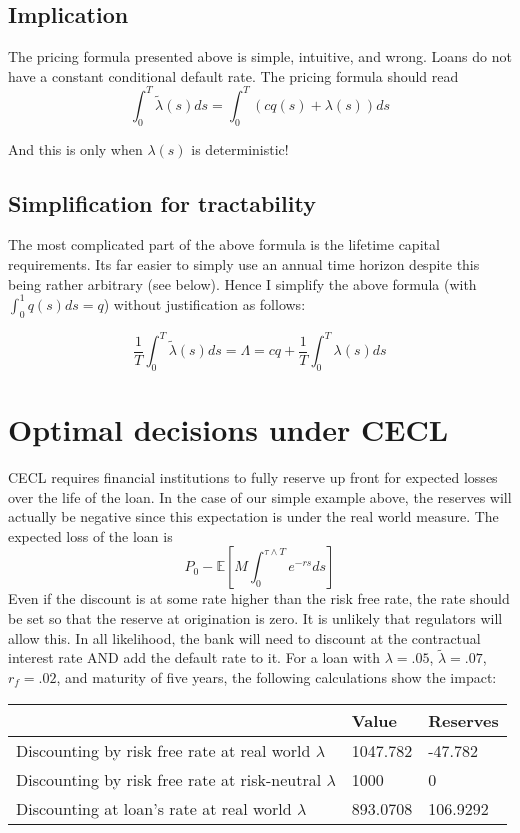 \documentclass{article}
\begin{document}
\subsection{Implication}

The pricing formula presented above is simple, intuitive, and wrong.  Loans do not have a constant conditional default rate.  The pricing formula should read \[\int_0^T\tilde{\lambda}(s) ds = \int_0^T \left(c q(s) +\lambda(s)\right)ds\]

And this is only when \(\lambda(s)\) is deterministic!  

\subsection{Simplification for tractability}

The most complicated part of the above formula is the lifetime capital requirements.  Its far easier to simply use an annual time horizon despite this being rather arbitrary (see below).  Hence I simplify the above formula (with \(\int_0 ^ 1 q(s)ds=q\)) without justification as follows:

\[\frac{1}{T} \int_0^T\tilde{\lambda}(s) ds=\Lambda = c q+\frac{1}{T}\int_0^T\lambda(s)ds\]




\section{Optimal decisions under CECL}

CECL requires financial institutions to fully reserve up front for expected losses over the life of the loan. In the case of our simple example above, the reserves will actually be negative since this expectation is under the real world measure.  The expected loss of the loan is 
\[P_0-\mathbb{E}[M\int_0^{\tau \wedge T} e^{-rs} ds]\] 
Even if the discount is at some rate higher than the risk free rate, the rate should be set so that the reserve at origination is zero.  It is unlikely that regulators will allow this.  In all likelihood, the bank will need to discount at the contractual interest rate AND add the default rate to it.  For a loan with \(\lambda=.05\), \(\tilde{\lambda}=.07\), \(r_f=.02\), and maturity of five years, the following calculations show the impact: 

\begin{tabular}{l|l|l}
  & Value & Reserves \\
  \hline
  Discounting by risk free rate at real world \(\lambda\) &  1047.782 & -47.782 \\
  Discounting by risk free rate at risk-neutral \(\lambda\) & 1000 & 0 \\
  Discounting at loan's rate at real world \(\lambda\) & 893.0708 & 106.9292 \\
  \hline
\end{tabular}
\end{document}
